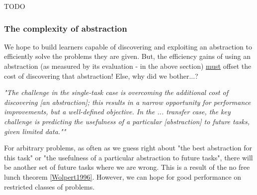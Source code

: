 
\cite{Allen-Zhu2016a,Johnson2013a}



{\color{red}TODO}

%
%
%

\subsubsection{The complexity of abstraction}

We hope to build learners capable of discovering and exploiting an abstraction
to efficiently solve the problems they are given.
But, the efficiency gains of using an abstraction (as measured by its evaluation - in the above section) \underline{must} offset the cost of
discovering that abstraction! Else, why did we bother...?

\begin{displayquote}
\textit{"The challenge in the single-task case is overcoming the additional cost of discovering [an abstraction];
this results in a narrow opportunity for performance improvements, but a well-defined objective.
In the ... transfer case, the key challenge is predicting the usefulness of a particular [abstraction] to future tasks, given limited data.""}\cite{Konidaris2019}
\end{displayquote}

For arbitrary problems, as often as we guess right about "the best abstraction for this task" or "the usefulness of a particular abstraction to future tasks",
there will be another set of future tasks where we are wrong. This is a result of the no free lunch theorem \ref{Wolpert1996}. However, we can hope for good performance on restricted classes of problems.

